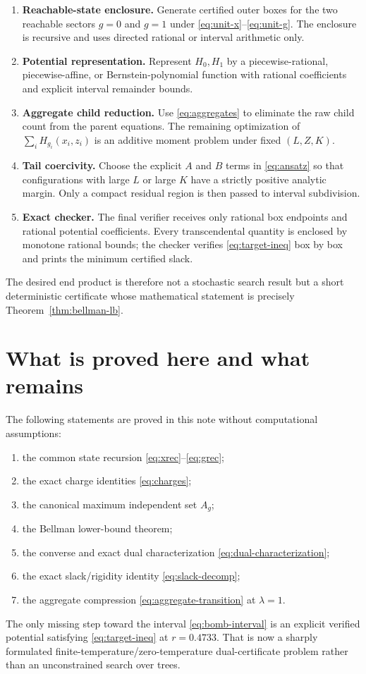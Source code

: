 \documentclass[11pt,a4paper]{article}
\theoremstyle{definition}
\theoremstyle{remark}
\newcommand{\1}{\mathbf 1}
\begin{document}
\begin{enumerate}[label=\textbf{C\arabic*.},leftmargin=2.2em]
\item \textbf{Reachable-state enclosure.}
Generate certified outer boxes for the two reachable sectors $g=0$ and $g=1$ under
\eqref{eq:unit-x}--\eqref{eq:unit-g}.  The enclosure is recursive and uses directed rational
or interval arithmetic only.

\item \textbf{Potential representation.}
Represent $H_0,H_1$ by a piecewise-rational, piecewise-affine, or Bernstein-polynomial
function with rational coefficients and explicit interval remainder bounds.

\item \textbf{Aggregate child reduction.}
Use \eqref{eq:aggregates} to eliminate the raw child count from the parent equations.  The
remaining optimization of $\sum_i H_{g_i}(x_i,z_i)$ is an additive moment problem under
fixed $(L,Z,K)$.

\item \textbf{Tail coercivity.}
Choose the explicit $A$ and $B$ terms in \eqref{eq:ansatz} so that configurations with large
$L$ or large $K$ have a strictly positive analytic margin.  Only a compact residual region is
then passed to interval subdivision.

\item \textbf{Exact checker.}
The final verifier receives only rational box endpoints and rational potential coefficients.
Every transcendental quantity is enclosed by monotone rational bounds; the checker verifies
\eqref{eq:target-ineq} box by box and prints the minimum certified slack.
\end{enumerate}

The desired end product is therefore not a stochastic search result but a short deterministic
certificate whose mathematical statement is precisely Theorem~\ref{thm:bellman-lb}.

\section{What is proved here and what remains}

The following statements are proved in this note without computational assumptions:
\begin{enumerate}[label=(\roman*)]
  \item the common state recursion \eqref{eq:xrec}--\eqref{eq:grec};
  \item the exact charge identities \eqref{eq:charges};
  \item the canonical maximum independent set $A_g$;
  \item the Bellman lower-bound theorem;
  \item the converse and exact dual characterization \eqref{eq:dual-characterization};
  \item the exact slack/rigidity identity \eqref{eq:slack-decomp};
  \item the aggregate compression \eqref{eq:aggregate-transition} at $\lambda=1$.
\end{enumerate}

The only missing step toward the interval \eqref{eq:bomb-interval} is an explicit verified
potential satisfying \eqref{eq:target-ineq} at $r=0.4733$.  That is now a sharply formulated
finite-temperature/zero-temperature dual-certificate problem rather than an unconstrained
search over trees.
\end{document}
